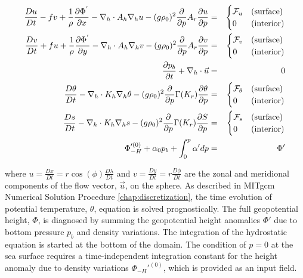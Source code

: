 \begin{eqnarray}
\label{eq:eg-global-model_equations_pcoord}
\frac{Du}{Dt} - fv + 
  \frac{1}{\rho}\frac{\partial \Phi^{'}}{\partial x} - 
  \nabla_{h}\cdot A_{h}\nabla_{h}u - 
  (g\rho_0)^2\frac{\partial}{\partial p}A_{r}\frac{\partial u}{\partial p} 
 & = &
\begin{cases}
{\cal F}_u & \text{(surface)} \\
0 & \text{(interior)}
\end{cases}
\\
\frac{Dv}{Dt} + fu + 
  \frac{1}{\rho}\frac{\partial \Phi^{'}}{\partial y} - 
  \nabla_{h}\cdot A_{h}\nabla_{h}v - 
  (g\rho_0)^2\frac{\partial}{\partial p}A_{r}\frac{\partial v}{\partial p} 
& = &
\begin{cases}
{\cal F}_v & \text{(surface)} \\
0 & \text{(interior)}
\end{cases}
\\
\frac{\partial p_{b}}{\partial t} + \nabla_{h}\cdot \vec{u}
&=&
0
\\
\frac{D\theta}{Dt} -
 \nabla_{h}\cdot K_{h}\nabla_{h}\theta
 - (g\rho_0)^2\frac{\partial}{\partial p}\Gamma(K_{r})\frac{\partial\theta}{\partial p} 
& = &
\begin{cases}
{\cal F}_\theta & \text{(surface)} \\
0 & \text{(interior)}
\end{cases}
\\
\frac{D s}{Dt} -
 \nabla_{h}\cdot K_{h}\nabla_{h}s
 - (g\rho_0)^2\frac{\partial}{\partial p}\Gamma(K_{r})\frac{\partial S}{\partial p} 
& = &
\begin{cases}
{\cal F}_s & \text{(surface)} \\
0 & \text{(interior)}
\end{cases}
\\
\Phi_{-H}'^{(0)} + \alpha_{0}p_{b}+ \int^{p}_{0}\alpha' dp & = & \Phi'
\end{eqnarray}

\noindent where $u=\frac{Dx}{Dt}=r \cos(\phi)\frac{D \lambda}{Dt}$ and 
$v=\frac{Dy}{Dt}=r \frac{D \phi}{Dt}$ are the zonal and meridional
components of the flow vector, $\vec{u}$, on the sphere. As described
in MITgcm Numerical Solution Procedure \ref{chap:discretization}, the
time evolution of potential temperature, $\theta$, equation is solved
prognostically. The full geopotential height, $\Phi$, is diagnosed by
summing the geopotential height anomalies $\Phi'$ due to bottom
pressure $p_{b}$ and density variations. The integration of the
hydrostatic equation is started at the bottom of the domain. The
condition of $p=0$ at the sea surface requires a time-independent
integration constant for the height anomaly due to density variations
$\Phi_{-H}'^{(0)}$, which is provided as an input field.


